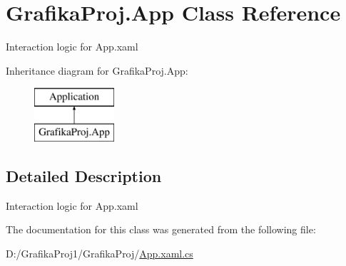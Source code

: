 \hypertarget{class_grafika_proj_1_1_app}{}\section{Grafika\+Proj.\+App Class Reference}
\label{class_grafika_proj_1_1_app}


Interaction logic for App.\+xaml  


Inheritance diagram for Grafika\+Proj.\+App\+:\begin{figure}[H]
\begin{center}
\leavevmode
\includegraphics[height=2.000000cm]{class_grafika_proj_1_1_app}
\end{center}
\end{figure}


\subsection{Detailed Description}
Interaction logic for App.\+xaml 



The documentation for this class was generated from the following file\+:\begin{DoxyCompactItemize}
\item 
D\+:/\+Grafika\+Proj1/\+Grafika\+Proj/\mbox{\hyperlink{_app_8xaml_8cs}{App.\+xaml.\+cs}}\end{DoxyCompactItemize}
